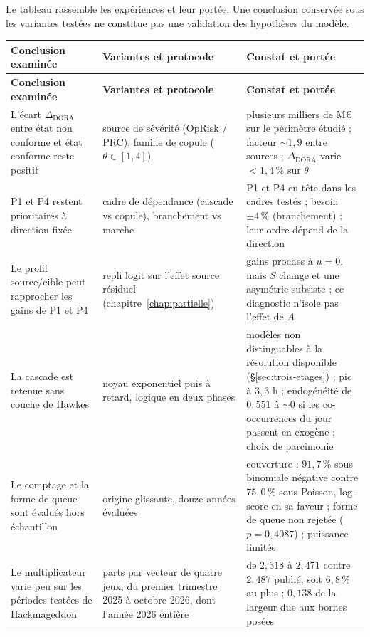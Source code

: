 Le tableau rassemble les expériences et leur portée. Une conclusion conservée sous les variantes
testées ne constitue pas une validation des hypothèses du modèle.

{\footnotesize
\renewcommand{\arraystretch}{1.3}
\begin{longtable}{@{}p{4.5cm} p{4.6cm} p{6.5cm}@{}}
\toprule
\textbf{Conclusion examinée} & \textbf{Variantes et protocole} & \textbf{Constat et portée} \\
\midrule
\endfirsthead
\toprule
\textbf{Conclusion examinée} & \textbf{Variantes et protocole} & \textbf{Constat et portée} \\
\midrule
\endhead
\bottomrule
\endlastfoot
L'écart $\Delta_{\text{DORA}}$ entre état non conforme et état conforme reste positif &
source de sévérité (OpRisk / PRC), famille de copule ($\theta\in[1,4]$) &
plusieurs milliers de M\euro{} sur le périmètre étudié ; facteur ${\sim}1{,}9$ entre sources ; $\Delta_{\text{DORA}}$ varie $<1{,}4\,\%$ sur $\theta$ \\
P1 et P4 restent prioritaires à direction fixée &
cadre de dépendance (cascade vs copule), branchement vs marche &
P1 et P4 en tête dans les cadres testés ; besoin $\pm4\,\%$ (branchement) ; leur ordre dépend de la direction \\
Le profil source/cible peut rapprocher les gains de P1 et P4 &
repli logit sur l'effet source résiduel (chapitre~\ref{chap:partielle}) &
gains proches à $u=0$, mais $S$ change et une asymétrie subsiste ; ce diagnostic n'isole pas l'effet de $A$ \\
La cascade est retenue sans couche de Hawkes &
noyau exponentiel puis à retard, logique en deux phases &
modèles non distinguables à la résolution disponible (\S\ref{sec:trois-etages}) ; pic à $3{,}3$ h ; endogénéité de $0{,}551$ à ${\sim}0$ si les co-occurrences du jour passent en exogène ; choix de parcimonie \\
Le comptage et la forme de queue sont évalués hors échantillon &
origine glissante, douze années évaluées &
couverture : $91{,}7\,\%$ sous binomiale négative contre $75{,}0\,\%$ sous Poisson, log-score en sa faveur ; forme de queue non rejetée ($p=0{,}4087$) ; puissance limitée \\
Le multiplicateur varie peu sur les périodes testées de Hackmageddon &
parts par vecteur de quatre jeux, du premier trimestre 2025 à octobre 2026, dont l'année 2026 entière &
de $2{,}318$ à $2{,}471$ contre $2{,}487$ publié, soit $6{,}8\,\%$ au plus ; $0{,}138$ de la largeur due aux bornes posées \\

\end{longtable}}
